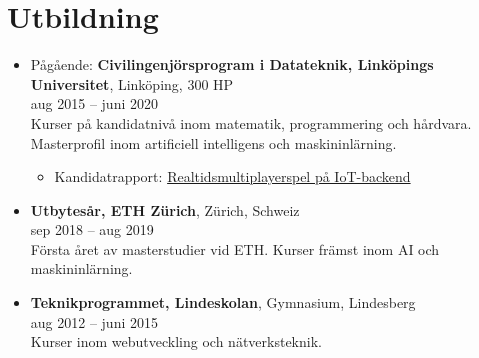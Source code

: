 \documentclass[12pt]{article}
\newcommand{\text}[2]{#2}
\newcommand{\text}[2]{#1}
\begin{document}
\section*{\text{Education}{Utbildning}}
\begin{itemize}
    \item \text{
            In progress: \textbf{Master programme in Computer Science and Engineering (Swedish Civilingenjörsprogram), Linköping University}, Linköping, 300 ECTS\\
        Aug 2015 -- June 2020\\
        }{
            Pågående: \textbf{Civilingenjörsprogram i Datateknik, Linköpings Universitet}, Linköping, 300 HP\\
        aug 2015 -- juni 2020\\
        }
        \text{
            Bachelor courses in mathematics, programming and electrical engineering. Master focused on machine learning and AI.
        }{
            Kurser på kandidatnivå inom matematik, programmering och hårdvara. Masterprofil inom artificiell intelligens och maskininlärning.
        }
        \begin{itemize}
            \item \text{
                    Bachelor thesis: \href{http://urn.kb.se/resolve?urn=urn:nbn:se:liu:diva-149042}{Real-time Multiplayer Game on IoT-backend}
                }{
                    Kandidatrapport: \href{http://urn.kb.se/resolve?urn=urn:nbn:se:liu:diva-149042}{Realtidsmultiplayerspel på IoT-backend}
                }
        \end{itemize}

    \item \text{
            \textbf{Exchange Year, ETH Zürich}, Zürich, Switzerland\\
        Sep 2018 -- Aug 2019\\
        }{
            \textbf{Utbytesår, ETH Zürich}, Zürich, Schweiz\\
        sep 2018 -- aug 2019\\
        }
        \text{
            First year of my master as an exchange student at ETH. Courses mainly in machine learning and AI.
        }{
            Första året av masterstudier vid ETH. Kurser främst inom AI och maskininlärning.
        }

    \item \text{
            \textbf{Technology Program, Lindeskolan}, Upper secondary school, Lindesberg\\
        Aug 2012 -- June 2015\\
        }{
            \textbf{Teknikprogrammet, Lindeskolan}, Gymnasium, Lindesberg\\
        aug 2012 -- juni 2015\\
        }
        \text{
            Courses in web development and network technologies.
        }{
            Kurser inom webutveckling och nätverksteknik.
        }

\end{itemize}
\end{document}
